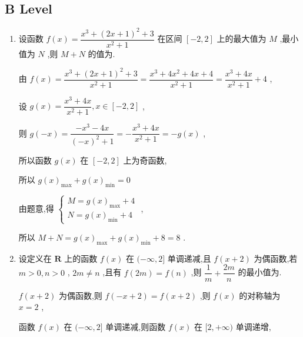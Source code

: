 \subsection*{B Level}
\begin{enumerate}
    \item 设函数 $f\left( x\right)  = \dfrac{{x}^{3} + {\left( 2x + 1\right) }^{2} + 3}{{x}^{2} + 1}$ 在区间 $\left\lbrack  {-2,2}\right\rbrack$ 上的最大值为 $M$ ,最小值为 $N$ ,则 $M + N$ 的值为.
    \begin{jieda}
        由 $f\left( x\right)  = \dfrac{{x}^{3} + {\left( 2x + 1\right) }^{2} + 3}{{x}^{2} + 1} = \dfrac{{x}^{3} + 4{x}^{2} + {4x} + 4}{{x}^{2} + 1} = \dfrac{{x}^{3} + {4x}}{{x}^{2} + 1} + 4$ ,
        
        设 $g\left( x\right)  = \dfrac{{x}^{3} + {4x}}{{x}^{2} + 1},x \in  \left\lbrack  {-2,2}\right\rbrack$ ,
        
        则 $g\left( {-x}\right)  = \dfrac{-{x}^{3} - {4x}}{{\left( -x\right) }^{2} + 1} =  - \dfrac{{x}^{3} + {4x}}{{x}^{2} + 1} =  - g\left( x\right)$ ,
        
        所以函数 $g\left( x\right)$ 在 $\left\lbrack  {-2,2}\right\rbrack$ 上为奇函数,
        
        所以 $g{\left( x\right) }_{\max } + g{\left( x\right) }_{\min } = 0$
        
        由题意,得 $\left\{  \begin{array}{l} M = g{\left( x\right) }_{\max } + 4 \\  N = g{\left( x\right) }_{\min } + 4 \end{array}\right.$ ,
        
        所以 $M + N = g{\left( x\right) }_{\max } + g{\left( x\right) }_{\min } + 8 = 8$ .
    \end{jieda}
    \item 设定义在 $\mathbf{R}$ 上的函数 $f\left( x\right)$ 在 $( - \infty ,2\rbrack$ 单调递减,且 $f\left( {x + 2}\right)$ 为偶函数,若 $m > 0,n > 0$ , ${2m} \neq  n$ ,且有 $f\left( {2m}\right)  = f\left( n\right)$ ,则 $\dfrac{1}{m} + \dfrac{2m}{n}$ 的最小值为. 
    \begin{jieda}
        $f\left( {x + 2}\right)$ 为偶函数,则 $f\left( {-x + 2}\right)  = f\left( {x + 2}\right)$ ,则 $f\left( x\right)$ 的对称轴为 $x = 2$ ,
        
        函数 $f\left( x\right)$ 在 $( - \infty ,2\rbrack$ 单调递减,则函数 $f\left( x\right)$ 在 $\lbrack 2, + \infty )$ 单调递增,
        

\end{jieda}
\end{enumerate}
